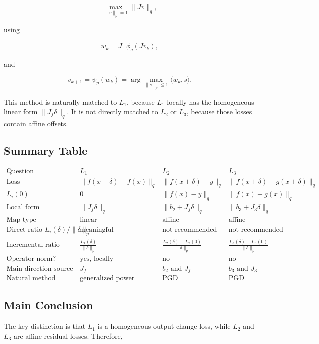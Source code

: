 \documentclass{article}
\begin{document}
\[
\max_{\|v\|_p=1}\|Jv\|_q,
\]

using

\[
w_k
=
J^\top\phi_q(Jv_k),
\]

and

\[
v_{k+1}
=
\psi_p(w_k)
=
\arg\max_{\|s\|_p\le 1}
\langle w_k,s\rangle.
\]

This method is naturally matched to \(L_1\), because \(L_1\) locally has the homogeneous linear form \(\|J_f\delta\|_q\). It is not directly matched to \(L_2\) or \(L_3\), because those losses contain affine offsets.

\subsection{Summary Table}

\[
\begin{array}{c|c|c|c}
\text{Question}
& L_1
& L_2
& L_3
\\
\hline
\text{Loss}
&
\|f(x+\delta)-f(x)\|_q
&
\|f(x+\delta)-y\|_q
&
\|f(x+\delta)-g(x+\delta)\|_q
\\
\hline
L_i(0)
&
0
&
\|f(x)-y\|_q
&
\|f(x)-g(x)\|_q
\\
\hline
\text{Local form}
&
\|J_f\delta\|_q
&
\|b_2+J_f\delta\|_q
&
\|b_3+J_3\delta\|_q
\\
\hline
\text{Map type}
&
\text{linear}
&
\text{affine}
&
\text{affine}
\\
\hline
\text{Direct ratio } L_i(\delta)/\|\delta\|_p
&
\text{meaningful}
&
\text{not recommended}
&
\text{not recommended}
\\
\hline
\text{Incremental ratio}
&
\frac{L_1(\delta)}{\|\delta\|_p}
&
\frac{L_2(\delta)-L_2(0)}{\|\delta\|_p}
&
\frac{L_3(\delta)-L_3(0)}{\|\delta\|_p}
\\
\hline
\text{Operator norm?}
&
\text{yes, locally}
&
\text{no}
&
\text{no}
\\
\hline
\text{Main direction source}
&
J_f
&
b_2 \text{ and } J_f
&
b_3 \text{ and } J_3
\\
\hline
\text{Natural method}
&
\text{generalized power iteration}
&
\text{PGD}
&
\text{PGD}
\end{array}
\]

\subsection{Main Conclusion}

The key distinction is that \(L_1\) is a homogeneous output-change loss, while \(L_2\) and \(L_3\) are affine residual losses. Therefore,
\end{document}
